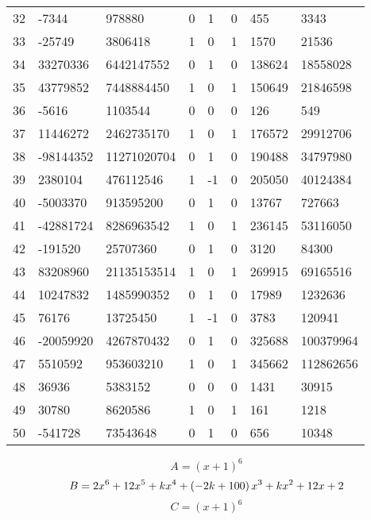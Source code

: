 \documentclass{amsart}
\begin{document}
\begin{longtable}{|l|l|l|lllll|}
32&-7344&978880&0&1&0&455&3343\\
33&-25749&3806418&1&0&1&1570&21536\\
34&33270336&6442147552&0&1&0&138624&18558028\\
35&43779852&7448884450&1&0&1&150649&21846598\\
36&-5616&1103544&0&0&0&126&549\\
37&11446272&2462735170&1&0&1&176572&29912706\\
38&-98144352&11271020704&0&1&0&190488&34797980\\
39&2380104&476112546&1&-1&0&205050&40124384\\
40&-5003370&913595200&0&1&0&13767&727663\\
41&-42881724&8286963542&1&0&1&236145&53116050\\
42&-191520&25707360&0&1&0&3120&84300\\
43&83208960&21135153514&1&0&1&269915&69165516\\
44&10247832&1485990352&0&1&0&17989&1232636\\
45&76176&13725450&1&-1&0&3783&120941\\
46&-20059920&4267870432&0&1&0&325688&100379964\\
47&5510592&953603210&1&0&1&345662&112862656\\
48&36936&5383152&0&0&0&1431&30915\\
49&30780&8620586&1&0&1&161&1218\\
50&-541728&73543648&0&1&0&656&10348\\
\hline
\end{longtable}
$$A=(x
 + 1)^{6}$$
$$B=2\*x^6
 + 12\*x^5
 + k\*x^4
 + \left(-2\*k
 + 100\right) \*x^3
 + k\*x^2
 + 12\*x
 + 2$$
$$C=(x
 + 1)^{6}$$
\end{document}
